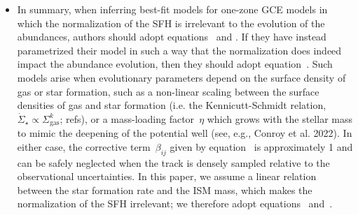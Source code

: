 \documentclass[ms.tex]{subfiles}
\begin{document}
\begin{itemize}
	\item In summary, when inferring best-fit models for one-zone GCE models
	in which the normalization of the SFH is irrelevant to the evolution of the
	abundances, authors should adopt equations~ and
	.
	If they have instead parametrized their model in such a way that the
	normalization does indeed impact the abundance evolution, then they should
	adopt equation~.
	Such models arise when evolutionary parameters depend on the surface
	density of gas or star formation, such as a non-linear scaling between the
	surface densities of gas and star formation (i.e. the Kennicutt-Schmidt
	relation,~$\dot{\Sigma}_\star \propto \Sigma_\text{gas}^k$; refs), or a
	mass-loading factor~$\eta$ which grows with the stellar mass to mimic the
	deepening of the potential well (see, e.g., Conroy et al. 2022).
	In either case, the corrective term~$\beta_{ij}$ given by
	equation~ is approximately 1 and can be safely
	neglected when the track is densely sampled relative to the observational
	uncertainties.
	In this paper, we assume a linear relation between the star formation rate
	and the ISM mass, which makes the normalization of the SFH irrelevant; we
	therefore adopt equations~
	and~.

\end{itemize}
\end{document}
